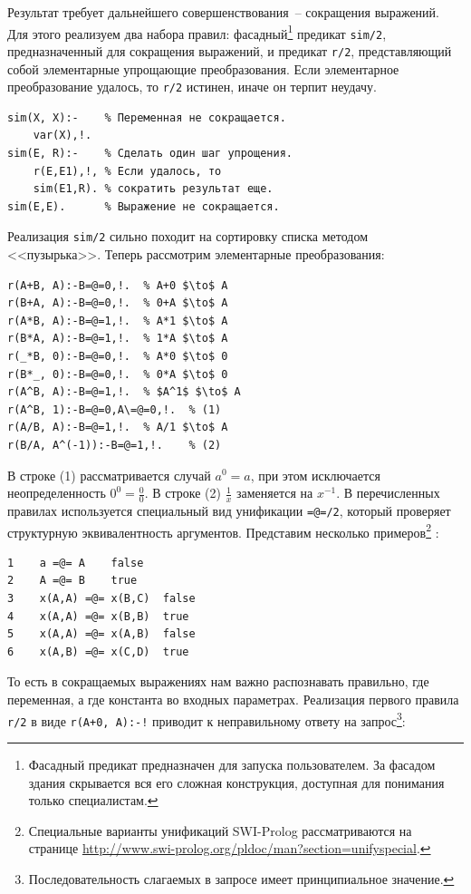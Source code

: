 \documentclass[a4paper,14pt, openany, twoside, final]{extbook} %
\begin{document}
Результат требует дальнейшего совершенствования~-- сокращения выражений.  Для этого реализуем два набора правил: фасадный\footnote{Фасадный предикат предназначен для запуска пользователем.  За фасадом здания скрывается вся его сложная конструкция, доступная для понимания только специалистам. } предикат \texttt{sim/2}, предназначенный для сокращения выражений, и предикат \texttt{r/2}, представляющий собой элементарные упрощающие преобразования.  Если элементарное преобразование удалось, то \texttt{r/2} истинен, иначе он терпит неудачу.

\begin{verbatim}
sim(X, X):-    % Переменная не сокращается.
    var(X),!.
sim(E, R):-    % Сделать один шаг упрощения.
    r(E,E1),!, % Если удалось, то
    sim(E1,R). % сократить результат еще.
sim(E,E).      % Выражение не сокращается.
\end{verbatim}

\noindent{}Реализация \texttt{sim/2} сильно походит на сортировку списка методом <<пузырька>>.  Теперь рассмотрим элементарные преобразования:

\begin{verbatim}
r(A+B, A):-B=@=0,!.  % A+0 $\to$ A
r(B+A, A):-B=@=0,!.  % 0+A $\to$ A
r(A*B, A):-B=@=1,!.  % A*1 $\to$ A
r(B*A, A):-B=@=1,!.  % 1*A $\to$ A
r(_*B, 0):-B=@=0,!.  % A*0 $\to$ 0
r(B*_, 0):-B=@=0,!.  % 0*A $\to$ 0
r(A^B, A):-B=@=1,!.  % $A^1$ $\to$ A
r(A^B, 1):-B=@=0,A\=@=0,!.  % (1)
r(A/B, A):-B=@=1,!.  % A/1 $\to$ A
r(B/A, A^(-1)):-B=@=1,!.    % (2)
\end{verbatim}

В строке (1) рассматривается случай $a^0=a$, при этом исключается неопределенность $0^0=\frac{0}{0}$.  В строке (2) $\frac{1}{x}$ заменяется на $x^{-1}$.  В перечисленных правилах используется специальный вид унификации \texttt{=@=/2}, который проверяет структурную эквивалентность аргументов.  Представим несколько примеров\footnote{Специальные варианты унификаций SWI-Prolog рассматриваются на странице \url{http://www.swi-prolog.org/pldoc/man?section=unifyspecial}.} \cite{SWIP}:

\begin{verbatim}
1    a =@= A    false
2    A =@= B    true
3    x(A,A) =@= x(B,C)  false
4    x(A,A) =@= x(B,B)  true
5    x(A,A) =@= x(A,B)  false
6    x(A,B) =@= x(C,D)  true
\end{verbatim}

То есть в сокращаемых выражениях нам важно распознавать правильно, где переменная, а где константа во входных параметрах.  Реализация первого правила \texttt{r/2} в виде \texttt{r(A+0, A):-!} приводит к неправильному ответу на запрос\footnote{Последовательность слагаемых в запросе имеет принципиальное значение.}:
\end{document}
